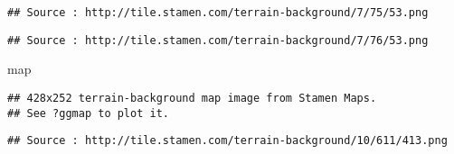 \documentclass[
]{article}
\newenvironment{Shaded}{\begin{snugshade}}{\end{snugshade}}
\newcommand{\AttributeTok}[1]{\textcolor[rgb]{0.77,0.63,0.00}{#1}}
\newcommand{\CommentTok}[1]{\textcolor[rgb]{0.56,0.35,0.01}{\textit{#1}}}
\newcommand{\DecValTok}[1]{\textcolor[rgb]{0.00,0.00,0.81}{#1}}
\newcommand{\FunctionTok}[1]{\textcolor[rgb]{0.00,0.00,0.00}{#1}}
\newcommand{\NormalTok}[1]{#1}
\newcommand{\OtherTok}[1]{\textcolor[rgb]{0.56,0.35,0.01}{#1}}
\newcommand{\SpecialCharTok}[1]{\textcolor[rgb]{0.00,0.00,0.00}{#1}}
\newcommand{\StringTok}[1]{\textcolor[rgb]{0.31,0.60,0.02}{#1}}
\begin{document}
\begin{verbatim}
## Source : http://tile.stamen.com/terrain-background/7/75/53.png
\end{verbatim}

\begin{verbatim}
## Source : http://tile.stamen.com/terrain-background/7/76/53.png
\end{verbatim}

\begin{Shaded}
\begin{Highlighting}[]
\NormalTok{map}
\end{Highlighting}
\end{Shaded}

\begin{verbatim}
## 428x252 terrain-background map image from Stamen Maps. 
## See ?ggmap to plot it.
\end{verbatim}

\begin{Shaded}
\end{Shaded}

\begin{verbatim}
## Source : http://tile.stamen.com/terrain-background/10/611/413.png
\end{verbatim}
\end{document}
